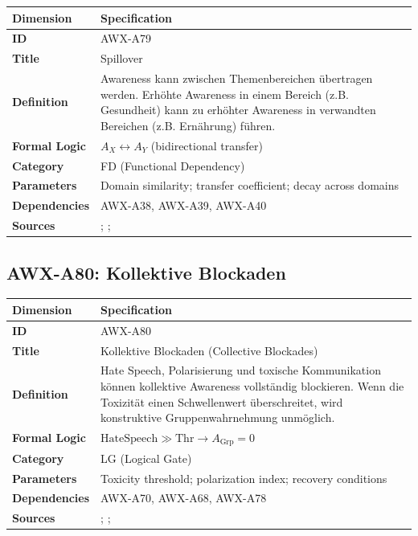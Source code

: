 \begin{table}[htbp]
\small
\begin{tabular}{p{3cm}p{11cm}}
\toprule
\textbf{Dimension} & \textbf{Specification} \\
\midrule
\textbf{ID} & AWX-A79 \\
\textbf{Title} & Spillover \\
\textbf{Definition} & Awareness kann zwischen Themenbereichen übertragen werden. Erhöhte Awareness in einem Bereich (z.B. Gesundheit) kann zu erhöhter Awareness in verwandten Bereichen (z.B. Ernährung) führen. \\
\textbf{Formal Logic} & $A_X \leftrightarrow A_Y$ (bidirectional transfer) \\
\textbf{Category} & FD (Functional Dependency) \\
\textbf{Parameters} & Domain similarity; transfer coefficient; decay across domains \\
\textbf{Dependencies} & AWX-A38, AWX-A39, AWX-A40 \\
\textbf{Sources} & \citet{thaler1999mental}; \citet{dolan2012influencing}; \citet{milkman2014holding} \\
\bottomrule
\end{tabular}
\end{table}


\subsection{AWX-A80: Kollektive Blockaden}

\begin{table}[htbp]
\small
\begin{tabular}{p{3cm}p{11cm}}
\toprule
\textbf{Dimension} & \textbf{Specification} \\
\midrule
\textbf{ID} & AWX-A80 \\
\textbf{Title} & Kollektive Blockaden (Collective Blockades) \\
\textbf{Definition} & Hate Speech, Polarisierung und toxische Kommunikation können kollektive Awareness vollständig blockieren. Wenn die Toxizität einen Schwellenwert überschreitet, wird konstruktive Gruppenwahrnehmung unmöglich. \\
\textbf{Formal Logic} & $\text{HateSpeech} \gg \text{Thr} \rightarrow A_{\text{Grp}} = 0$ \\
\textbf{Category} & LG (Logical Gate) \\
\textbf{Parameters} & Toxicity threshold; polarization index; recovery conditions \\
\textbf{Dependencies} & AWX-A70, AWX-A68, AWX-A78 \\
\textbf{Sources} & \citet{sunstein2017republic}; \citet{bail2018exposure}; \citet{brady2017emotion} \\
\bottomrule
\end{tabular}
\end{table}


